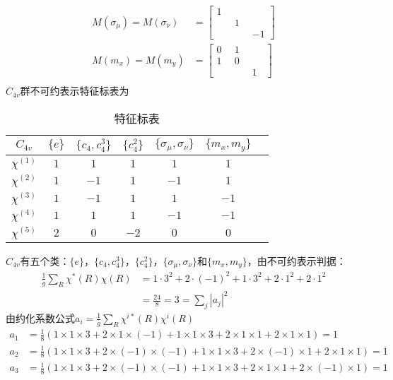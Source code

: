 \documentclass[12pt]{article}
\numberwithin{equation}{section}	 %
\begin{document}
\begin{spacing}{1.5}
\begin{align*}
M(\sigma_{\mu}) = M(\sigma_{\nu}) &= \begin{bmatrix} 1 & \quad & \quad \\ \quad & 1 & \quad \\ \quad & \quad & -1 \end{bmatrix} \\
M(m_{x}) = M(m_{y}) &= \begin{bmatrix} 0 & 1 & \quad \\ 1 & 0 & \quad \\ \quad & \quad & 1 \end{bmatrix} \\
\end{align*}
$C_{4v}$群不可约表示特征标表为 \\
\begin{longtable}{c|cccccc}
\caption{特征标表}\\
	$C_{4v}$ & $\{e\}$ & $\{c_{4},c_{4}^{3}\}$ & $\{c_{4}^{2}\}$ & $\{\sigma_{\mu},\sigma_{\nu}\}$ & $\{m_{x},m_{y}\}$ \\
	\hline
	$\chi^{(1)}$ & $1$ & $1$ & $1$ & $1$ & $1$ \\
	$\chi^{(2)}$ & $1$ & $-1$ & $1$ & $-1$ & $1$ \\
	$\chi^{(3)}$ & $1$ & $-1$ & $1$ & $1$ & $-1$ \\
	$\chi^{(4)}$ & $1$ & $1$ & $1$ & $-1$ & $-1$ \\
	$\chi^{(5)}$ & $2$ & $0$ & $-2$ & $0$ & $0$ \\
\end{longtable}
$C_{4v}$有五个类：$\{e\}$，$\{c_{4},c_{4}^{3}\}$，$\{c_{4}^{2}\}$，$\{\sigma_{\mu},\sigma_{\nu}\}$和$\{m_{x},m_{y}\}$，由不可约表示判据：
\begin{align*}
\frac{1}{g}\sum_{R}\chi^{*}(R)\chi(R) &= 1\cdot3^{2} + 2\cdot(-1)^{2} + 1\cdot3^{2} + 2\cdot1^{2} + 2\cdot1^{2} \\
&= \frac{24}{8} = 3 = \sum_{j}\left|a_{j}\right|^{2}
\end{align*}
由约化系数公式$\displaystyle a_{i} = \frac{1}{g}\sum_{R}\chi^{i*}(R)\chi^{i}(R)$
\begin{align*}
a_{1} &= \frac{1}{8}(1\times1\times3+2\times1\times(-1)+1\times1\times3+2\times1\times1+2\times1\times1) = 1 \\
a_{2} &= \frac{1}{8}(1\times1\times3+2\times(-1)\times(-1)+1\times1\times3+2\times(-1)\times1+2\times1\times1) = 1 \\
a_{3} &= \frac{1}{8}(1\times1\times3+2\times(-1)\times(-1)+1\times1\times3+2\times1\times1+2\times(-1)\times1) = 1 \\

\end{align*}
\end{spacing}
\end{document}
